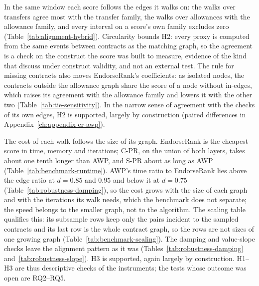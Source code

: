 In the same window each score follows the edges it walks on: the walks over transfers agree most with the transfer family, the walks over allowances with the allowance family, and every interval on a score's own family excludes zero (Table~\ref{tab:alignment-hybrid}). Circularity bounds H2: every proxy is computed from the same events between contracts as the matching graph, so the agreement is a check on the construct the score was built to measure, evidence of the kind that \textcite{cronbach1955construct} discuss under construct validity, and not an external test. The rule for missing contracts also moves EndorseRank's coefficients: as isolated nodes, the contracts outside the allowance graph share the score of a node without in-edges, which raises its agreement with the allowance family and lowers it with the other two (Table~\ref{tab:tie-sensitivity}). In the narrow sense of agreement with the checks of its own edges, H2 is supported, largely by construction (paired differences in Appendix~\ref{ch:appendix-er-awp}).

The cost of each walk follows the size of its graph. EndorseRank is the cheapest score in time, memory and iterations; \mbox{C-PR}, on the union of both layers, takes about one tenth longer than AWP, and \mbox{S-PR} about as long as AWP (Table~\ref{tab:benchmark-runtime}). AWP's time ratio to EndorseRank lies above the edge ratio at $d=0.85$ and $0.95$ and below it at $d=0.75$ (Table~\ref{tab:robustness-damping}), so the cost grows with the size of each graph \parencite{langville2006pagerank} and with the iterations its walk needs, which the benchmark does not separate; the speed belongs to the smaller graph, not to the algorithm. The scaling table qualifies this: its subsample rows keep only the pairs incident to the sampled contracts and its last row is the whole contract graph, so the rows are not sizes of one growing graph (Table~\ref{tab:benchmark-scaling}). The damping and value-slope checks leave the alignment pattern as it was (Tables~\ref{tab:robustness-damping} and~\ref{tab:robustness-slope}). H3 is supported, again largely by construction. H1--H3 are thus descriptive checks of the instruments; the tests whose outcome was open are RQ2--RQ5.



